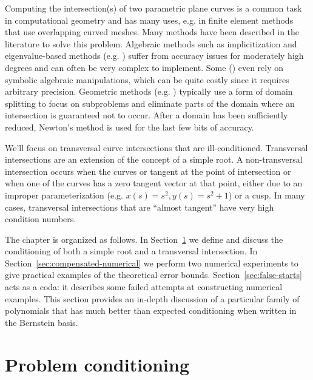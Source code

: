 Computing the intersection(s) of two parametric plane curves is a
common task in computational geometry and has many uses, e.g. in
finite element methods that use overlapping curved meshes. Many
methods have been described in the literature to solve this problem.
Algebraic methods such as implicitization and eigenvalue-based
methods (e.g. \cite{Manocha:CSD-92-698}) suffer
from accuracy issues for moderately high degrees and can often be
very complex to implement. Some (\cite{Bates2008}) even rely on symbolic
algebraic manipulations, which can be quite costly since it requires
arbitrary precision.
Geometric methods (e.g. \cite{Sederberg1986, Sederberg1990, Kim1998})
typically use a form of domain splitting to focus on subproblems and
eliminate parts of the domain where an intersection is guaranteed not
to occur. After a domain has been sufficiently reduced, Newton's method
is used for the last few bits of accuracy.

We'll focus on transversal curve intersections that are ill-conditioned.
Transversal intersections are an extension of the concept of a
simple root. A non-transversal intersection occurs when the curves
or tangent at the point of intersection or when one of the curves
has a zero tangent vector at that point, either due to an improper
parameterization (e.g. \(x(s) = s^2, y(s) = s^2 + 1\)) or a cusp.
In many cases, transversal intersections that are ``almost tangent'' have
very high condition numbers.

The chapter is organized as follows. In Section~\ref{sec:conditioning}
we define and discuss the conditioning of both a simple root and
a transversal intersection. In Section~\ref{sec:compensated-numerical}
we perform two numerical experiments to give practical examples of the
theoretical error bounds. Section~\ref{sec:false-starts} acts as a
coda: it describes some failed attempts at constructing numerical
examples. This section provides an in-depth discussion of a particular
family of polynomials that has much better than expected conditioning
when written in the Bernstein basis.

\section{Problem conditioning}\label{sec:conditioning}

